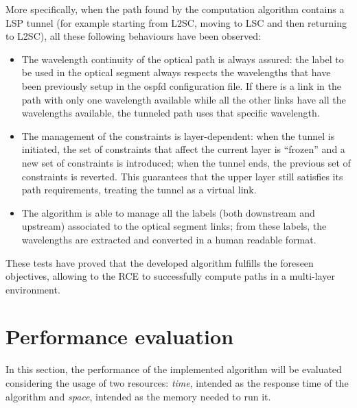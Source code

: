 \documentclass[10pt,a4paper]{report}
\begin{document}
More specifically, when the path found by the computation algorithm
contains a LSP tunnel (for example starting from L2SC, moving to LSC
and then returning to L2SC), all these following behaviours have been
observed:
\begin{itemize}
\item The wavelength continuity of the optical path is always assured:
  the label to be used in the optical segment always respects the
  wavelengths that have been previously setup in the ospfd
  configuration file. If there is a link in the path with only one
  wavelength available while all the other links have all the
  wavelengths available, the tunneled path uses that specific
  wavelength.
\item The management of the constraints is layer-dependent: when the
  tunnel is initiated, the set of constraints that affect the current
  layer is ``frozen'' and a new set of constraints is introduced; when
  the tunnel ends, the previous set of constraints is reverted. This
  guarantees that the upper layer still satisfies its path
  requirements, treating the tunnel as a virtual link.
\item The algorithm is able to manage all the labels (both downstream
  and upstream) associated to the optical segment links; from these
  labels, the wavelengths are extracted and converted in a human
  readable format.
\end{itemize}

These tests have proved that the developed algorithm fulfills the
foreseen objectives, allowing to the RCE to successfully compute paths
in a multi-layer environment.

\section{Performance evaluation}

In this section, the performance of the implemented algorithm will be
evaluated considering the usage of two resources: \textit{time},
intended as the response time of the algorithm and \textit{space},
intended as the memory needed to run it.
\end{document}
